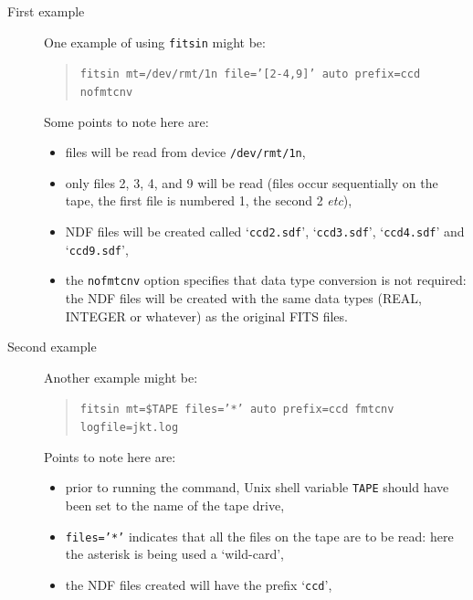 \documentclass[twoside,11pt]{article}
\begin{document}
\begin{description}

  \item[First example] One example of using {\tt fitsin} might be:

  \begin{quote}
   {\tt fitsin mt=/dev/rmt/1n file='[2-4,9]' auto prefix=ccd nofmtcnv}
  \end{quote}

   Some points to note here are:

  \begin{itemize}

    \item files will be read from device {\tt /dev/rmt/1n},

    \item only files 2, 3, 4, and 9 will be read (files occur sequentially
     on the tape, the first file is numbered 1, the second 2 \emph{etc}),

    \item NDF files will be created called `{\tt ccd2.sdf}', 
     `{\tt ccd3.sdf}', `{\tt ccd4.sdf}' and `{\tt ccd9.sdf}',

    \item the {\tt nofmtcnv} option specifies that data type conversion
     is not required: the NDF files will be created with the same data
     types (REAL, INTEGER or whatever) as the original FITS files.

  \end{itemize}

  \item[Second example] Another example might be:

  \begin{quote}
   {\tt fitsin mt=\$TAPE files='*' auto prefix=ccd fmtcnv logfile=jkt.log}
  \end{quote}

   Points to note here are:

  \begin{itemize}

    \item prior to running the command, Unix shell variable {\tt TAPE}
     should have been set to the name of the tape drive,

    \item {\tt files='*'} indicates that all the files on the tape are
     to be read: here the asterisk is being used a `wild-card',

    \item the NDF files created will have the prefix `{\tt ccd}',


\end{itemize}
\end{description}
\end{document}
